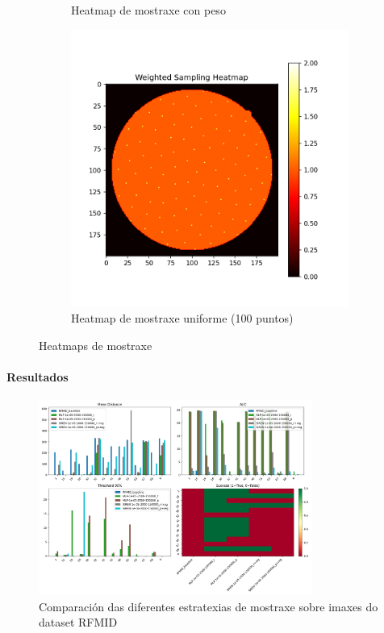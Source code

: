 \begin{figure}[]
\begin{subfigure}[b]{0.3\textwidth}
        \caption{Heatmap de mostraxe con peso}
        \label{fig:weighted_sampling_heatmap}
    \end{subfigure}
    \hfill
    \begin{subfigure}[b]{0.3\textwidth}
        \centering
        \includegraphics[width=\textwidth]{imaxes/uniform_sampling_heatmap.png}
        \caption{Heatmap de mostraxe uniforme (100 puntos)}
        \label{fig:uniform_sampling_heatmap}
    \end{subfigure}
    \caption{Heatmaps de mostraxe}
    \label{fig:sampling_heatmaps}
\end{figure}


\paragraph{Resultados}
\label{par:Resultados}


\begin{figure}[ht]
    \centering
    \includegraphics[width=0.8\textwidth]{imaxes/RFMID_both__comp_sampling.png}
    \caption{Comparación das diferentes estratexias de mostraxe sobre imaxes do dataset RFMID}
    \label{fig:sampling_comparison}
\end{figure}

